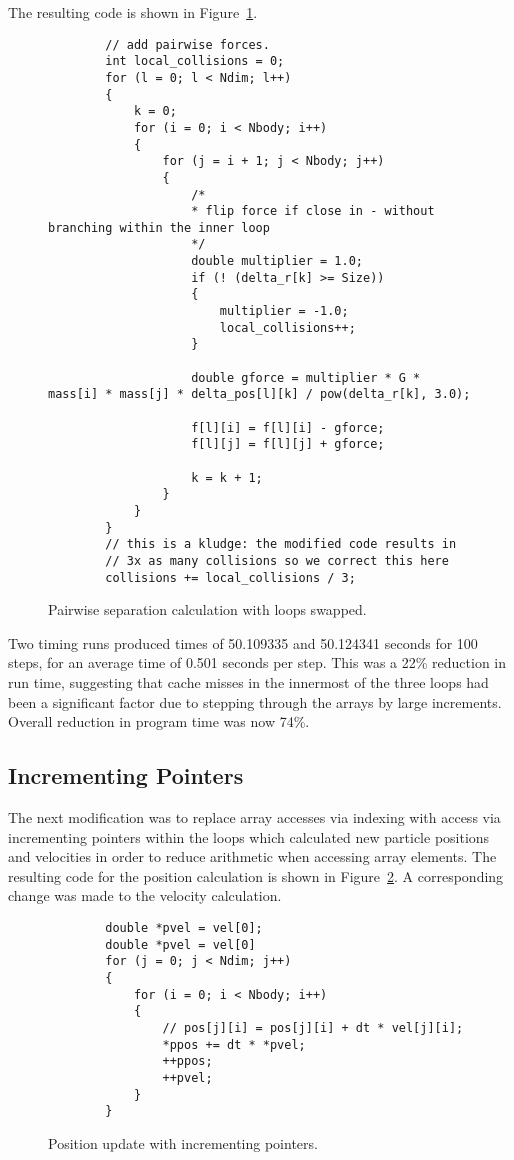 \documentclass[11pt, oneside]{article}   %
\begin{document}
The resulting code is shown in Figure~\ref{figure:PairSwap}.

\begin{figure}
	\begin{lstlisting}
		// add pairwise forces.
		int local_collisions = 0;
		for (l = 0; l < Ndim; l++)
		{
			k = 0;
			for (i = 0; i < Nbody; i++)
			{
				for (j = i + 1; j < Nbody; j++)
				{
					/*  
					* flip force if close in - without branching within the inner loop 
					*/
					double multiplier = 1.0;
					if (! (delta_r[k] >= Size))
					{
						multiplier = -1.0;
						local_collisions++;
					}

					double gforce = multiplier * G * mass[i] * mass[j] * delta_pos[l][k] / pow(delta_r[k], 3.0);

					f[l][i] = f[l][i] - gforce;
					f[l][j] = f[l][j] + gforce;

					k = k + 1;
				}
			}
		}
		// this is a kludge: the modified code results in 
		// 3x as many collisions so we correct this here
		collisions += local_collisions / 3;
	\end{lstlisting}
	\caption{Pairwise separation calculation with loops swapped.}
	\label{figure:PairSwap}
\end{figure}

Two timing runs produced times of 50.109335 and 50.124341 seconds for 100 steps, for an average time of 0.501 seconds per step.
This was a 22\% reduction in run time, suggesting that cache misses in the innermost of the three loops had been a significant factor due to stepping through the arrays by large increments.
Overall reduction in program time was now 74\%.

\subsection{Incrementing Pointers}
The next modification was to replace array accesses via indexing with access via incrementing pointers within the loops which calculated new particle positions and velocities in order to reduce arithmetic when accessing array elements.
The resulting code for the position calculation is shown in Figure~\ref{figure:PInc}.
A corresponding change was made to the velocity calculation.

\begin{figure}
	\begin{lstlisting}
		double *pvel = vel[0];
		double *pvel = vel[0]
		for (j = 0; j < Ndim; j++)
		{
			for (i = 0; i < Nbody; i++)
			{
				// pos[j][i] = pos[j][i] + dt * vel[j][i];
				*ppos += dt * *pvel;
				++ppos;
				++pvel;
			}
		}
	\end{lstlisting}
	\caption{Position update with incrementing pointers.}
	\label{figure:PInc}
\end{figure}
\end{document}
